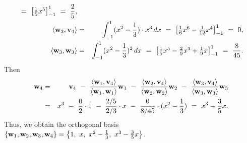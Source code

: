 \begin{solution}
\begin{eqnarray*}
    ~=~ \bigbracket{\textstyle\frac{1}{5}x^5}_{-1}^{1}
    ~=~ \frac{2}{5},
    \\
    \iprod{\vect{w}_3,\vect{v}_4}
    &=& \int_{-1}^{1} (x^2-\frac{1}{3})\cdot x^3\,dx
    ~=~ \bigbracket{\textstyle\frac{1}{6}x^6 - \frac{1}{12}x^4}_{-1}^{1}
    ~=~ 0,
    \\
    \iprod{\vect{w}_3,\vect{w}_3}
    &=& \int_{-1}^{1} (x^2-\frac{1}{3})^2\,dx
    ~=~ \bigbracket{\textstyle\frac{1}{5}x^5-\frac{2}{9}x^3+\frac{1}{9}x}_{-1}^{1}
    ~=~ \frac{8}{45}.
  \end{eqnarray*}
  Then
  \begin{eqnarray*}
    \vect{w}_4
    &=& \vect{v}_4
        ~-~ \frac{\iprod{\vect{w}_1,\vect{v}_4}}{\iprod{\vect{w}_1,\vect{w}_1}}\vect{w}_1
        ~-~ \frac{\iprod{\vect{w}_2,\vect{v}_4}}{\iprod{\vect{w}_2,\vect{w}_2}}\vect{w}_2
        ~-~ \frac{\iprod{\vect{w}_3,\vect{v}_4}}{\iprod{\vect{w}_3,\vect{w}_3}}\vect{w}_3
    \\
    &=& x^3 ~-~ \frac{0}{2}\cdot 1 ~-~ \frac{2/5}{2/3}\cdot x ~-~ \frac{0}{8/45}\cdot(x^2-\frac{1}{3})
        ~=~ x^3 - \frac{3}{5}x.
  \end{eqnarray*}
  Thus, we obtain the orthogonal basis $\set{\vect{w}_1,\vect{w}_2,\vect{w}_3,\vect{w}_4} =
  \set{1,~ x,~ x^2-\frac{1}{3},~ x^3 - \frac{3}{5}x}$.
\end{solution}

